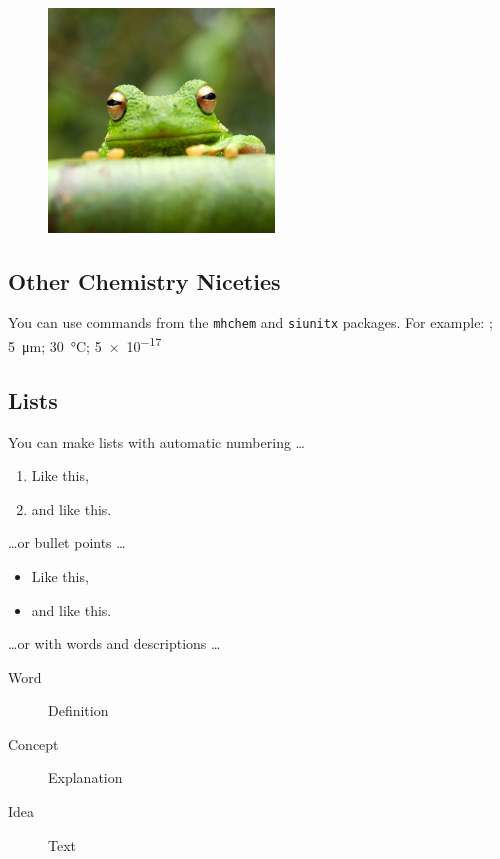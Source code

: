 \documentclass[9pt,lineno]{elife}
\begin{document}
\begin{figure}
% 
% 
{\includegraphics[width=6cm]{frog}}
% 
% 
\label{videosupp:sv1}
\label{figdata:first}
\label{figdata:second}
\label{figsrccode:first}
\end{figure}

\subsection{Other Chemistry Niceties}

You can use commands from the \texttt{mhchem} and \texttt{siunitx} packages. For example: ; \SI{5}{\micro\metre}; \SI{30}{\degreeCelsius}; \SI{5e-17}{\Molar}

\subsection{Lists}

You can make lists with automatic numbering \dots

\begin{enumerate}
\item Like this,
\item and like this.
\end{enumerate}
\dots or bullet points \dots
\begin{itemize} 
\item Like this,
\item and like this.
\end{itemize}
\dots or with words and descriptions \dots
\begin{description}
\item[Word] Definition
\item[Concept] Explanation
\item[Idea] Text
\end{description}
\end{document}
